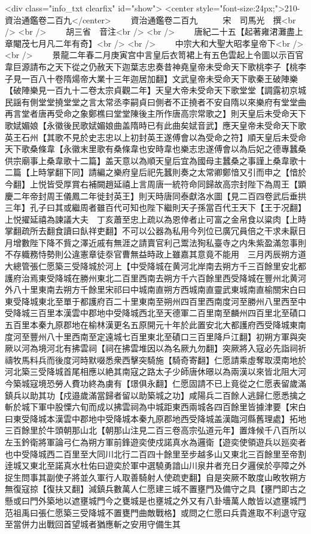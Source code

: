 <div class="info_txt clearfix" id="show">
<center style="font-size:24px;">210-資治通鑑卷二百九</center>
  　　資治通鑑卷二百九　　　宋　司馬光　撰<br />
<br />
　　胡三省　音注<br />
<br />
　　唐紀二十五【起著雍涒灘盡上章閹茂七月凡二年有奇】<br />
<br />
　　中宗大和大聖大昭孝皇帝下<br />
<br />
　　景龍二年春二月庚寅宫中言皇后衣笥裙上有五色雲起上令圖以示百官韋巨源請布之天下從之仍赦天下迦葉志忠奏昔神堯皇帝未受命天下歌桃李子【桃李子見一百八十卷隋煬帝大業十三年迦居加翻】文武皇帝未受命天下歌秦王破陣樂【破陣樂見一百九十二卷太宗貞觀二年】天皇大帝未受命天下歌堂堂【調露初京城民謡有側堂堂撓堂堂之言太常丞李嗣貞曰側者不正撓者不安自隋以來樂府有堂堂曲再言堂者唐再受命之象鄭樵曰堂堂陳後主所作唐高宗常歌之】則天皇后未受命天下歌娬媚娘【永徽後民歌娬媚娘曲盖隋時已有此曲矣娬音武】應天皇帝未受命天下歌英王石州【其歌不見於史志忠以上初封英王遂傅會以為受命之符】順天皇后未受命天下歌桑條韋【永徽末里歌有桑條韋也安時韋也樂志忠遂傅會以為后妃之德專蠶桑供宗廟事上桑韋歌十二篇】盖天意以為順天皇后宜為國母主蠶桑之事謹上桑韋歌十二篇【上時掌翻下同】請編之樂府皇后祀先蠶則奏之太常卿鄭愔又引而申之【愔於今翻】上悦皆受厚賞右補闕趙延禧上言周唐一統符命同歸故高宗封陛下為周王【顕慶二年帝封周王儀鳳二年徙封英王】則天時唐同泰獻洛水圖【見二百四卷武后垂拱三年】孔子曰其或繼周者雖百代可知也陛下繼則天子孫當百代王天下【王于况翻】上悦擢延禧為諫議大夫　丁亥蕭至忠上疏以為恩倖者止可富之金帛食以粱肉【上時掌翻疏所去翻食讀曰飤祥吏翻】不可以公器為私用今列位已廣冗員倍之干求未厭日月增數陛下降不貲之澤近戚有無涯之請賣官利己鬻法狥私臺寺之内朱紫盈滿忽事則不存軄務恃勢則公違憲章徒沗官曹無益時政上雖嘉其意竟不能用　三月丙辰朔方道大總管張仁愿築三受降城於河上【中受降城在黄河北岸南去朔方千三百餘里安北都護府治焉東受降城在勝州東北二百里西南去朔方千六百餘里西受降城在豐州北黄河外八十里東南去朔方千餘里宋祁曰中城南直朔方西城南直靈武東城南直榆關宋白曰東受降城東北至單于都護府百二十里東南至朔州四百里西南度河至勝州八里西至中受降城三百里本漢雲中郡地中受降城西北至天德軍二百里南至麟州四百里北至磧口五百里本秦九原郡地在榆林漢更名五原開元十年於此置安北大都護府西受降城東南度河至豐州八十里西南至定遠城七百里東北至磧口三百里降戶江翻】初朔方軍與突厥以河為境河北有拂雲祠【祠在拂雲堆因以為名厥九勿翻】突厥將入寇必先詣祠祈禱牧馬料兵而後度河時默啜悉衆西擊突騎施【騎奇寄翻】仁愿請乘虛奪取漠南地於河北築三受降城首尾相應以絶其南寇之路太子少師唐休暻以為兩漢以來皆北阻大河今築城寇境恐勞人費功終為虜有【璟俱永翻】仁愿固請不已上竟從之仁愿表留歲滿鎮兵以助其功【戍邉歲滿當歸者留以助築城之功】咸陽兵二百餘人逃歸仁愿悉擒之斬於城下軍中股慄六旬而成以拂雲祠為中城距東西兩城各四百餘里皆據津要【宋白曰東受降城本漢雲中郡地中受降城本秦九原郡地西受降城盖漢臨河縣舊理處】拓地三百餘里於牛頭朝那山北【朝那山注見二百三卷高宗弘道元年】置烽候千八百所以左玉鈐衛將軍論弓仁為朔方軍前鋒遊奕使戍諾真水為邏衛【遊奕使領遊兵以廵奕者也中受降城西二百里至大同川北行二百四十餘里至步越多山又東北三百餘里至帝割逹城又東北至諾真水杜佑曰遊奕於軍中選驍勇諳山川泉井者充日夕邏侯於亭障之外捉生問事其副使子將並久軍行人取善騎射人使疏吏翻】自是突厥不敢度山畋牧朔方無復寇掠【復扶又翻】減鎮兵數萬人仁愿建三城不置壅門及備守之具【壅門即古之懸或曰門外築地以遮壅城門今之甕城是也壅城之外又有八卦墻萬人敵皆以遮壅城門范祖禹曰張仁愿築三受降城不置甕門曲敵戰格】或問之仁愿曰兵貴進取不利退守寇至當併力出戰回首望城者猶應斬之安用守備生其